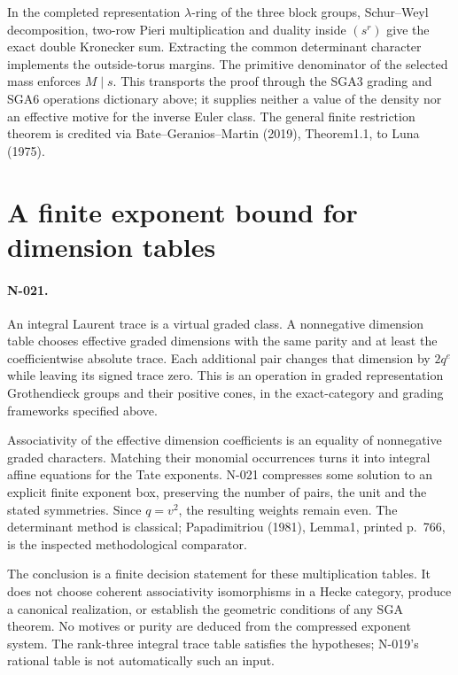 In the completed representation $\lambda$-ring of the three block
groups, Schur--Weyl decomposition, two-row Pieri multiplication and
duality inside $(s^r)$ give the exact double Kronecker sum. Extracting
the common determinant character implements the outside-torus margins.
The primitive denominator of the selected mass enforces $M\mid s$.
This transports the proof through the SGA3 grading and SGA6 operations
dictionary above; it supplies neither a value of the density nor an
effective motive for the inverse Euler class. The general finite
restriction theorem is credited via Bate--Geranios--Martin (2019),
Theorem1.1, to Luna (1975).

\section{A finite exponent bound for dimension tables}
\paragraph{N-021.}
An integral Laurent trace is a virtual graded class. A nonnegative
dimension table chooses effective graded dimensions with the same
parity and at least the coefficientwise absolute trace. Each additional
pair changes that dimension by $2q^e$ while leaving its signed trace
zero. This is an operation in graded representation Grothendieck
groups and their positive cones, in the exact-category and grading
frameworks specified above.

Associativity of the effective dimension coefficients is an equality
of nonnegative graded characters. Matching their monomial occurrences
turns it into integral affine equations for the Tate exponents.
N-021 compresses some solution to an explicit finite exponent box,
preserving the number of pairs, the unit and the stated symmetries.
Since $q=v^2$, the resulting weights remain even. The determinant
method is classical; Papadimitriou (1981), Lemma1, printed p.~766,
is the inspected methodological comparator.

The conclusion is a finite decision statement for these multiplication
tables. It does not choose coherent associativity isomorphisms in a
Hecke category, produce a canonical realization, or establish the
geometric conditions of any SGA theorem. No motives or purity are
deduced from the compressed exponent system. The rank-three integral
trace table satisfies the hypotheses; N-019's rational table is not
automatically such an input.
